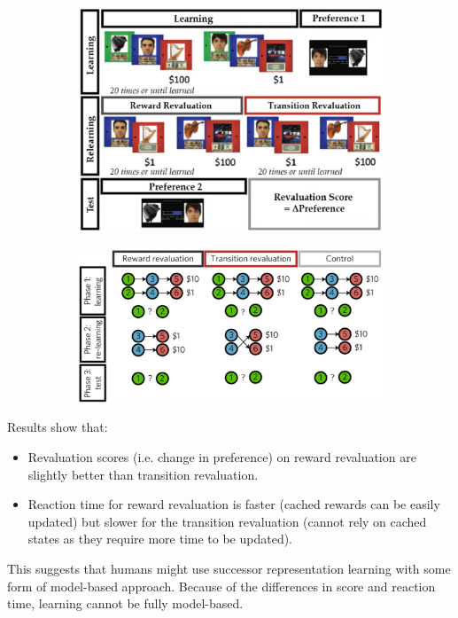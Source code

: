 \begin{casestudy}
    \begin{figure}[H]
        \centering
        \begin{subfigure}{0.48\linewidth}
            \centering
            \includegraphics[width=0.9\linewidth]{./img/human_sr1.png}
        \end{subfigure}
        \begin{subfigure}{0.48\linewidth}
            \centering
            \includegraphics[width=0.95\linewidth]{./img/human_sr2.png}
        \end{subfigure}
    \end{figure}

    Results show that:
    \begin{itemize}
        \item Revaluation scores (i.e. change in preference) on reward revaluation are slightly better than transition revaluation.
        \item Reaction time for reward revaluation is faster (cached rewards can be easily updated) but 
            slower for the transition revaluation (cannot rely on cached states as they require more time to be updated).
    \end{itemize} 
    This suggests that humans might use successor representation learning with some form of model-based approach.
    Because of the differences in score and reaction time, learning cannot be fully model-based.


\end{casestudy}
